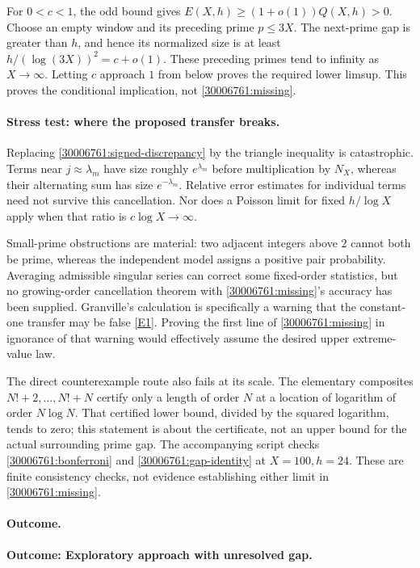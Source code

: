 \documentclass[11pt,a4paper]{article}
\newcommand{\eref}[2]{\hyperlink{extra:#1:#2}{[E#2]}}
\numberwithin{equation}{section}
\begin{document}
For $0<c<1$, the odd bound gives
$E(X,h)\ge(1+o(1))Q(X,h)>0$. Choose an empty window and its preceding
prime $p\le3X$. The next-prime gap is greater than $h$, and hence its
normalized size is at least
$h/(\log(3X))^2=c+o(1)$. These preceding primes tend to infinity as
$X\to\infty$. Letting $c$ approach $1$ from below proves the required
lower limsup. This proves the conditional implication, not
\eqref{30006761:missing}.

\paragraph{Stress test: where the proposed transfer breaks.}
Replacing \eqref{30006761:signed-discrepancy} by the triangle inequality is
catastrophic. Terms near $j\approx\lambda_m$ have size roughly
$e^{\lambda_m}$ before multiplication by $N_X$, whereas their alternating
sum has size $e^{-\lambda_m}$. Relative error estimates for individual
terms need not survive this cancellation. Nor does a Poisson limit for
fixed $h/\log X$ apply when that ratio is $c\log X\to\infty$.

Small-prime obstructions are material: two adjacent integers above $2$
cannot both be prime, whereas the independent model assigns a positive
pair probability. Averaging admissible singular series can correct some
fixed-order statistics, but no growing-order cancellation theorem with
\eqref{30006761:missing}'s accuracy has been supplied. Granville's calculation
is specifically a warning that the constant-one transfer may be false
\eref{30006761}{1}. Proving the first line of \eqref{30006761:missing} in ignorance
of that warning would effectively assume the desired upper extreme-value
law.

The direct counterexample route also fails at its scale. The elementary
composites $N!+2,\ldots,N!+N$ certify only a length of order $N$ at a
location of logarithm of order $N\log N$. That certified lower bound,
divided by the squared logarithm, tends to zero; this statement is about
the certificate, not an upper bound for the actual surrounding prime gap.
The accompanying script checks \eqref{30006761:bonferroni} and
\eqref{30006761:gap-identity} at $X=100,h=24$. These are finite consistency
checks, not evidence establishing either limit in \eqref{30006761:missing}.

\paragraph{Outcome.}
\textbf{Outcome: Exploratory approach with unresolved gap.}
\end{document}
